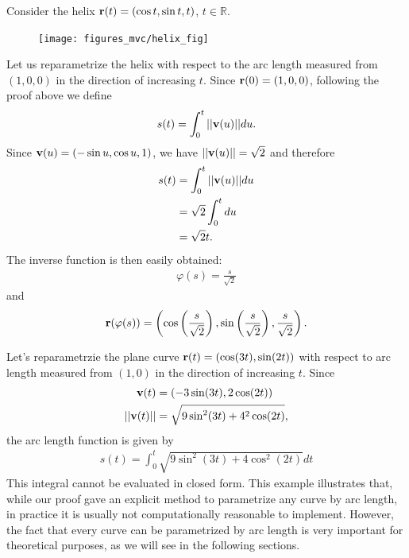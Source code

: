 \documentclass[12pt,letterpaper,reqno]{article}
\numberwithin{equation}{section}
\newcommand{\R}{\ensuremath{\mathbb R}}
\newcommand{\bv}{{\bf v}}
\newcommand{\bbr}{{\bf r}}
\begin{document}
{\begin{example}\label{ex:helix_param_by_arc_length}
Consider the helix $\bbr(t)=(\cos t, \sin t, t)$, $t \in \R$. 
\begin{figure}[h]
	\begin{center}
		\texttt{[image: figures\_mvc/helix\_fig]}
	\end{center}
\end{figure}

 Let us reparametrize the helix with respect to the arc length measured from $(1,0,0)$ in the direction of increasing $t$. Since $\bbr(0)=(1,0,0)$, following the proof above we define
\begin{align*}
	s(t)=\int_0^t||\bv(u)||du.
\end{align*}
Since $\bv(u)=(-\sin u,\cos u,1)$, we have $||\bv(u)||=\sqrt{2}$ and therefore
\begin{align*}
	s(t)&=\int_0^t||\bv(u)||du \\
	&=\sqrt{2}\int_0^t du \\
	&=\sqrt{2}t.
\end{align*}
The inverse function is then easily obtained:
\begin{align*}
	\varphi(s)=\frac{s}{\sqrt{2}}
\end{align*}
and 
\begin{align*}
	\bbr(\varphi(s))=\left(\cos\left(\frac{s}{\sqrt{2}}\right),\sin\left(\frac{s}{\sqrt{2}}\right),\frac{s}{\sqrt{2}}\right).
\end{align*}
\end{example}

\begin{example}
Let's reparametrzie the plane curve $\bbr(t)=(\cos(3t),\sin(2t))$ with respect to arc length measured from $(1,0)$ in the direction of increasing $t$. Since
	\begin{align*}
		\bv(t)&=(-3\sin(3t),2\cos(2t)) \\
		||\bv(t)||&=\sqrt{9\sin^2(3t)+4^2\cos(2t)},
	\end{align*}
	the arc length function is given by
	\begin{align*}
		s(t)=\int_0^t\sqrt{9\sin^2(3t)+4\cos^2(2t)}dt
	\end{align*}
	This integral cannot be evaluated in closed form. This example illustrates that, while our proof gave an explicit method to parametrize any curve by arc length, in practice it is usually not computationally reasonable to implement. However, the fact that every curve can be parametrized by arc length is very important for theoretical purposes, as we will see in the following sections.
\end{example}

}
\end{document}

